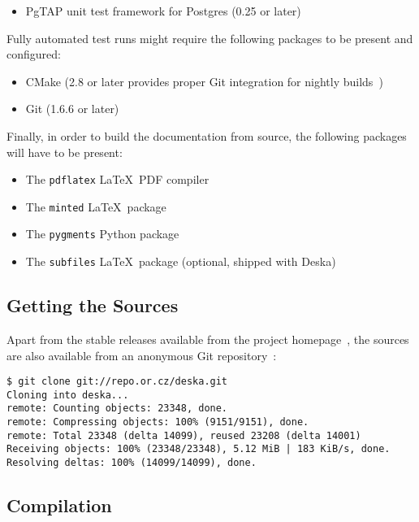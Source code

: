 \documentclass[deska]{subfiles}
\begin{document}
\begin{itemize}
    \item PgTAP unit test framework for Postgres (0.25 or later)~\cite{pgtap}
\end{itemize}

Fully automated test runs might require the following packages to be present and configured:

\begin{itemize}
    \item CMake (2.8 or later provides proper Git integration for nightly builds~\cite{deska-dashboard})
    \item Git (1.6.6 or later)
\end{itemize}

Finally, in order to build the documentation from source, the following packages will have to be present:

\begin{itemize}
    \item The {\tt pdflatex} \LaTeX~PDF compiler
    \item The {\tt minted} \LaTeX~package~\cite{latex-minted}
    \item The {\tt pygments} Python package~\cite{pygments}
    \item The {\tt subfiles} \LaTeX~package (optional, shipped with Deska)~\cite{latex-subfiles}
\end{itemize}

\subsection{Getting the Sources}

Apart from the stable releases available from the project homepage~\cite{deska-project}, the sources are also available
from an anonymous Git repository~\cite{deska-git}:

\begin{verbatim}
$ git clone git://repo.or.cz/deska.git
Cloning into deska...
remote: Counting objects: 23348, done.
remote: Compressing objects: 100% (9151/9151), done.
remote: Total 23348 (delta 14099), reused 23208 (delta 14001)
Receiving objects: 100% (23348/23348), 5.12 MiB | 183 KiB/s, done.
Resolving deltas: 100% (14099/14099), done.
\end{verbatim}

\subsection{Compilation}
\end{document}

